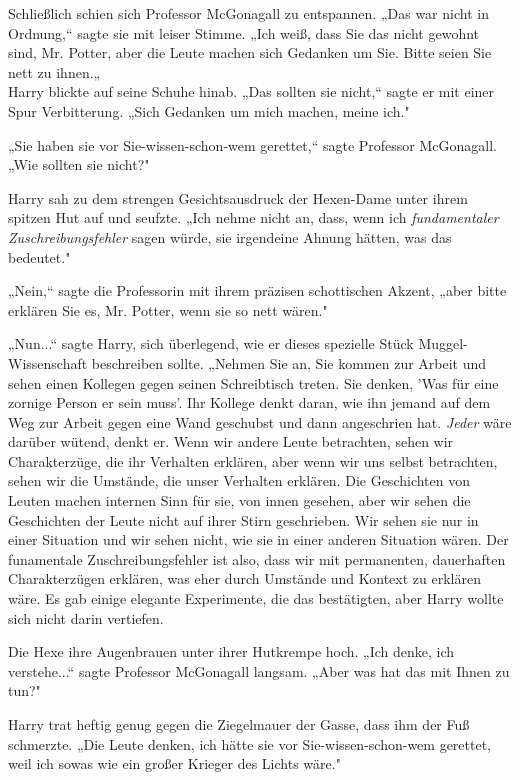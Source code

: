 {Schließlich schien sich Professor McGonagall zu entspannen. „Das war nicht in Ordnung,“ sagte sie mit leiser Stimme. „Ich weiß, dass Sie das nicht gewohnt sind, Mr. Potter, aber die Leute machen sich Gedanken um Sie. Bitte seien Sie nett zu ihnen.„\\ Harry blickte auf seine Schuhe hinab. „Das sollten sie nicht,“ sagte er mit einer Spur Verbitterung. „Sich Gedanken um mich machen, meine ich."

„Sie haben sie vor Sie-wissen-schon-wem gerettet,“ sagte Professor McGonagall. „Wie sollten sie nicht?"

Harry sah zu dem strengen Gesichtsausdruck der Hexen-Dame unter ihrem spitzen Hut auf und seufzte. „Ich nehme nicht an, dass, wenn ich \emph{fundamentaler Zuschreibungsfehler} sagen würde, sie irgendeine Ahnung hätten, was das bedeutet."

„Nein,“ sagte die Professorin mit ihrem präzisen schottischen Akzent, „aber bitte erklären Sie es, Mr. Potter, wenn sie so nett wären."

„Nun...“ sagte Harry, sich überlegend, wie er dieses spezielle Stück Muggel-Wissenschaft beschreiben sollte. „Nehmen Sie an, Sie kommen zur Arbeit und sehen einen Kollegen gegen seinen Schreibtisch treten. Sie denken, 'Was für eine zornige Person er sein muss'. Ihr Kollege denkt daran, wie ihn jemand auf dem Weg zur Arbeit gegen eine Wand geschubst und dann angeschrien hat. \emph{Jeder} wäre darüber wütend, denkt er. Wenn wir andere Leute betrachten, sehen wir Charakterzüge, die ihr Verhalten erklären, aber wenn wir uns selbst betrachten, sehen wir die Umstände, die unser Verhalten erklären. Die Geschichten von Leuten machen internen Sinn für sie, von innen gesehen, aber wir sehen die Geschichten der Leute nicht auf ihrer Stirn geschrieben. Wir sehen sie nur in einer Situation und wir sehen nicht, wie sie in einer anderen Situation wären. Der funamentale Zuschreibungsfehler ist also, dass wir mit permanenten, dauerhaften Charakterzügen erklären, was eher durch Umstände und Kontext zu erklären wäre. Es gab einige elegante Experimente, die das bestätigten, aber Harry wollte sich nicht darin vertiefen.

Die Hexe ihre Augenbrauen unter ihrer Hutkrempe hoch. „Ich denke, ich verstehe...“ sagte Professor McGonagall langsam. „Aber was hat das mit Ihnen zu tun?"

Harry trat heftig genug gegen die Ziegelmauer der Gasse, dass ihm der Fuß schmerzte. „Die Leute denken, ich hätte sie vor Sie-wissen-schon-wem gerettet, weil ich sowas wie ein großer Krieger des Lichts wäre."

}
